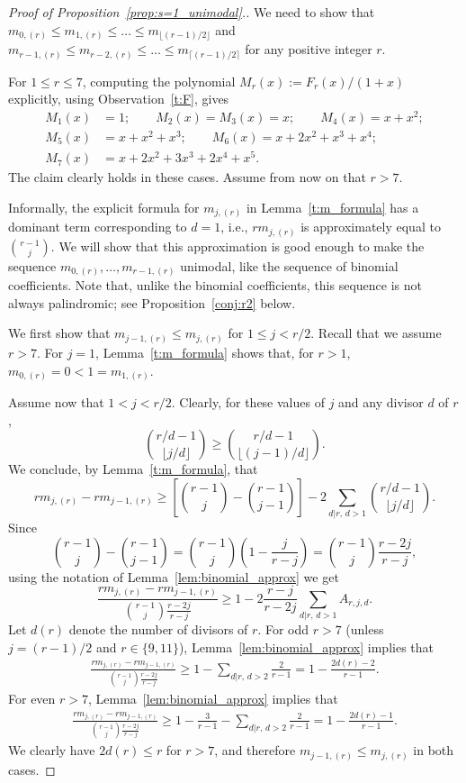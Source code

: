 \begin{proof}[Proof of Proposition~\ref{prop:s=1_unimodal}.]
    We need to show that $m_{0,(r)} \le m_{1,(r)} \le \ldots \le m_{\lfloor (r-1)/2 \rfloor}$ and     $m_{r-1,(r)} \le m_{r-2,(r)} \le \ldots \le m_{\lceil (r-1)/2 \rceil}$ for any positive integer $r$.
    
	For $1 \le r \le 7$, computing the polynomial $M_r(x) := F_r(x)/(1+x)$ explicitly, using Observation~\ref{t:F}, gives
	\begin{align*}
		M_1(x) &= 1; \qquad 
		M_2(x) = M_3(x) = x; \qquad
		M_4(x) = x+x^2; \\
		M_5(x) &= x+x^2+x^3; \qquad
		M_6(x) = x+2x^2+x^3+x^4; \\
		M_7(x) &= x+2x^2+3x^3+2x^4+x^5.
	\end{align*}
	The claim clearly holds in these cases.
	Assume from now on that $r > 7$.
	
    Informally, the explicit formula for $m_{j,(r)}$ in Lemma~\ref{t:m_formula} has a dominant term corresponding to $d=1$, i.e.,
    $rm_{j,(r)}$ is approximately equal to $\binom{r - 1}{j}$. 
    We will show that this approximation is good enough to make the sequence $m_{0,(r)}, \ldots, m_{r-1,(r)}$ unimodal, like the sequence of binomial coefficients.
    Note that, unlike the binomial coefficients, this sequence is not always palindromic; see Proposition~\ref{conj:r2} below.
    
	We first show that $m_{j-1,(r)} \le m_{j,(r)}$ for $1 \le j < r/2$. Recall that we assume $r > 7$.
	For $j=1$, Lemma~\ref{t:m_formula} shows that, 
	for $r > 1$, $m_{0,(r)} = 0 < 1 = m_{1,(r)}$. 
	
    Assume now that  $1 < j < r/2$.	
    Clearly, for these values of $j$ and any divisor $d$ of $r$,
	\[
	   \binom{r/d - 1}{\lfloor j/d \rfloor} 
	   \ge \binom{r/d - 1}{\lfloor (j-1)/d \rfloor}.
	\]
	We conclude, by Lemma~\ref{t:m_formula}, that
	\[
	    rm_{j,(r)} - rm_{j-1,(r)} 
	    \ge \left[ \binom{r-1}{j} - \binom{r-1}{j-1} \right] - 2\sum_{d|r,\,d>1} \binom{r/d - 1}{\lfloor j/d \rfloor}. 
    \]
	Since
	\[
	    \binom{r-1}{j} - \binom{r-1}{j-1}
	    = \binom{r-1}{j} \left(1 - \frac{j}{r-j}\right)
	    = \binom{r-1}{j} \frac{r-2j}{r-j},
	\]
    using the notation of Lemma~\ref{lem:binomial_approx} we get
	\[
	   \frac{rm_{j,(r)} - rm_{j-1,(r)}} {\binom{r-1}{j}\frac{r-2j}{r-j}}
	   \ge 1 - 2\frac{r-j}{r-2j} \sum_{d|r,\,d>1} A_{r,j,d}.
	\]
	Let $d(r)$ denote the number of divisors of $r$. 
	For odd $r>7$ (unless $j = (r-1)/2$ and $r \in \{9,11\}$), Lemma~\ref{lem:binomial_approx} implies that
	\begin{align*}
		\frac{rm_{j,(r)} - rm_{j-1,(r)}} {\binom{r-1}{j}\frac{r-2j}{r-j}} 
		\ge 1 - \sum_{d|r,\,d>2} \frac{2}{r-1} 
		= 1 - \frac{2d(r)-2}{r-1}.
	\end{align*}
	For even $r>7$, Lemma~\ref{lem:binomial_approx} implies that
	\begin{align*}
		\frac{rm_{j,(r)} - rm_{j-1,(r)}} {\binom{r-1}{j}\frac{r-2j}{r-j}} 
		\ge 1 - \frac{3}{r-1} - \sum_{d|r,\,d>2} \frac{2}{r-1}
		= 1 - \frac{2d(r)-1}{r-1}.
	\end{align*}
    We clearly have $2d(r) \le r$ for $r>7$, and therefore $m_{j-1,(r)} \le m_{j,(r)}$ in both cases.
	

\end{proof}
